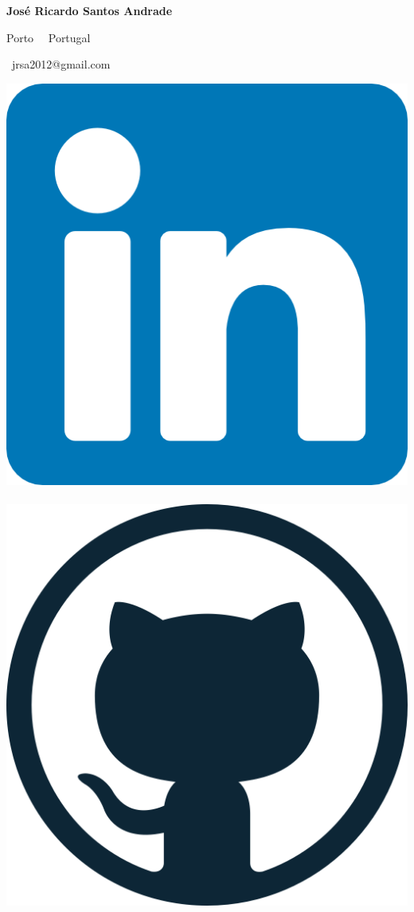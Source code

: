 \documentclass{mycv}
\begin{document}
\begin{center}
	{\LARGE\textbf{José Ricardo Santos Andrade}} \\
	\vspace{0.2cm}	
	
	Porto~\textbullet 
	\ Portugal	
	
	\ jrsa2012@gmail.com
	
	\vspace{0.4cm}
	
	\href{https://www.linkedin.com/in/jrsa2012}{\includegraphics[scale=0.06]{figs/linkedin_logo.png}}
	\ \ \ \
	\href{https://github.com/jrsa2012}{\includegraphics[scale=0.035]{figs/github_logo.png}}

\end{center}
\end{document}
